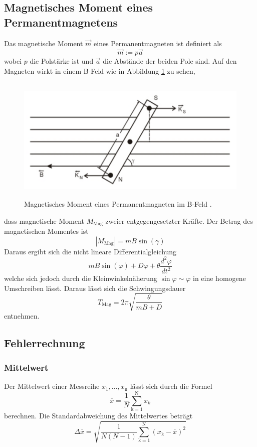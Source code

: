\subsection{Magnetisches Moment eines Permanentmagnetens}
Das magnetische Moment $\vec{m}$ eines Permanentmagneten ist definiert als
\begin{equation}
  \vec{m} := p \vec{a}
  \label{eqn:m}
\end{equation}
wobei $p$ die Polstärke ist und $\vec{a}$ die Abstände der beiden Pole sind. Auf den Magneten wirkt in einem B-Feld wie in Abbildung \ref{fig:MagM} zu sehen,
\begin{figure}
  \centering
  \includegraphics[height=6cm]{picture/MagM.png}
  \caption{Magnetisches Moment eines Permanentmagneten im B-Feld \cite{sample}.}
  \label{fig:MagM}
\end{figure}
dass magnetische Moment $M_\text{Mag}$ zweier entgegengesetzter Kräfte. Der Betrag des magnetischen Momentes ist
\begin{equation}
  |M_\text{Mag}| = m B \sin(\gamma)
  \label{eqn:MM}
\end{equation}
Daraus ergibt sich die nicht lineare Differentialgleichung
\begin{equation}
  mB \sin(\varphi) + D \varphi + \theta \frac{d^2 \varphi}{dt^2}
  \label{eqn:idgl}
\end{equation}
welche sich jedoch durch die Kleinwinkelnäherung $\sin \varphi \sim \varphi$ in eine homogene Umschreiben lässt. Daraus lässt sich die Schwingungsdauer
\begin{equation}
  T_\text{Mag} = 2 \pi \sqrt{\frac{\theta}{mB + D}}
  \label{eqn:Tmag}
\end{equation}
entnehmen.
\subsection{Fehlerrechnung}
\subsubsection{Mittelwert}
Der Mittelwert einer Messreihe $x_\text{1}, ... ,x_\text{n}$ lässt sich durch die Formel
\begin{equation}
	\overline{x} = \frac{1}{N} \sum_{\text{k}=1}^\text{N} x_k
	\label{eqn:ave}
\end{equation}
berechnen. Die Standardabweichung des Mittelwertes beträgt
\begin{equation}
	\Delta \overline{x} = \sqrt{ \frac{1}{N(N-1)} \sum_{\text{k}=1}^\text{N} (x_\text{k} - \overline{x})^2}
	\label{eqn:std}
\end{equation}

